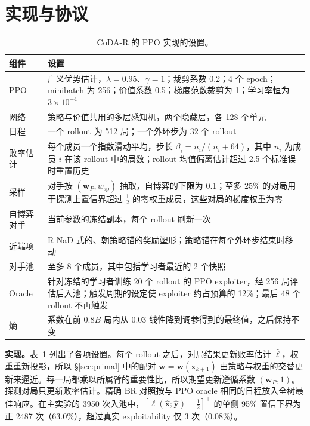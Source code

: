 \documentclass{article}
\theoremstyle{plain}
\theoremstyle{remark}
\newcommand{\bx}{{\bm{x}}}
\newcommand{\by}{{\bm{y}}}
\newcommand{\bw}{{\bm{w}}}
\newcommand{\bell}{{\bm{\ell}}}
\newcommand{\wsp}{w_{\mathrm{sp}}}
\newcommand{\codar}{CoDA-R}
\begin{document}
\section{实现与协议}
\label{app:impl}

\begin{table}[!htbp]
\caption{\codar{} 的 PPO 实现的设置。}
\label{tab:settings}
\begin{center}
\footnotesize
\begin{tabular}{lp{11cm}}
\toprule
组件 & 设置 \\
\midrule
PPO & 广义优势估计\citep{schulman2016gae}，$\lambda=0.95$、$\gamma=1$；裁剪系数 0.2；4 个 epoch；minibatch 为 256；价值系数 0.5；梯度范数裁剪为 1；学习率恒为 $3\times10^{-4}$ \\
网络 & 策略与价值共用的多层感知机，两个隐藏层，各 128 个单元 \\
日程 & 一个 rollout 为 512 局；一个外环步为 32 个 rollout \\
败率估计 & 每个成员一个指数滑动平均，步长 $\beta_i=n_i/(n_i+64)$，其中 $n_i$ 为成员 $i$ 在该 rollout 中的局数；rollout 均值偏离估计超过 2.5 个标准误时重置历史 \\
采样 & 对手按 $(\bw_P,\wsp)$ 抽取，自博弈的下限为 0.1；至多 25\% 的对局用于探测上置信界超过 $\tfrac12$ 的零权重成员，这些对局的梯度权重为零 \\
自博弈对手 & 当前参数的冻结副本，每个 rollout 刷新一次 \\
近端项 & R-NaD 式的、朝策略锚的奖励塑形；策略锚在每个外环步结束时移动 \\
对手池 & 至多 8 个成员，其中包括学习者最近的 2 个快照 \\
Oracle & 针对冻结的学习者训练 20 个 rollout 的 PPO exploiter，经 256 局评估后入池；触发周期的设定使 exploiter 约占预算的 12\%；最后 48 个 rollout 不再触发 \\
熵 & 系数在前 $0.8B$ 局内从 0.03 线性降到调参得到的最终值，之后保持不变 \\
\bottomrule
\end{tabular}
\end{center}
\end{table}

\textbf{实现。}表~\ref{tab:settings} 列出了各项设置。每个 rollout 之后，对局结果更新败率估计 $\hat{\bell}$，权重重新投影，所以 \S\ref{sec:primal} 中的配对 $\bw=\bw(\bx_{k+1})$ 由策略与权重的交替更新来逼近。每一局都乘以所属臂的重要性比，所以期望更新遵循系数 $(\bw_P,1)$。探测对局只更新败率估计。精确 BR 对照按与 PPO oracle 相同的日程放入全树最佳响应。在主实验的 3950 次入池中，$[\ell(\hat\bx;\hat\by)-\tfrac12]^+$ 的单侧 95\% 置信下界为正 2487 次（63.0\%），超过真实 exploitability 仅 3 次（0.08\%）。
\end{document}
